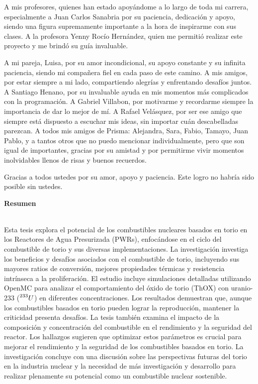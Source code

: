 A mis profesores, quienes han estado apoyándome a lo largo de toda mi carrera, especialmente a Juan Carlos Sanabria por su paciencia, dedicación y apoyo, siendo una figura supremamente importante a la hora de inspirarme con sus clases. A la profesora Yenny Rocío Hernández, quien me permitió realizar este proyecto y me brindó su guía invaluable.

A mi pareja, Luisa, por su amor incondicional, su apoyo constante y su infinita paciencia, siendo mi compañera fiel en cada paso de este camino. A mis amigos, por estar siempre a mi lado, compartiendo alegrías y enfrentando desafíos juntos. A Santiago Henano, por su invaluable ayuda en mis momentos más complicados con la programación. A Gabriel Villabon, por motivarme y recordarme siempre la importancia de dar lo mejor de mí. A Rafael Velásquez, por ser ese amigo que siempre está dispuesto a escuchar mis ideas, sin importar cuán descabelladas parezcan. A todos mis amigos de Prisma: Alejandra, Sara, Fabio, Tamayo, Juan Pablo, y a tantos otros que no puedo mencionar individualmente, pero que son igual de importantes, gracias por su amistad y por permitirme vivir momentos inolvidables llenos de risas y buenos recuerdos.

Gracias a todos ustedes por su amor, apoyo y paciencia. Este logro no habría sido posible sin ustedes.
\newpage

\textbf{\LARGE Resumen}
\\
Esta tesis explora el potencial de los combustibles nucleares basados en torio en los Reactores de Agua Presurizada (PWRs), enfocándose en el ciclo del combustible de torio y sus diversas implementaciones. La investigación investiga los beneficios y desafíos asociados con el combustible de torio, incluyendo sus mayores ratios de conversión, mejores propiedades térmicas y resistencia intrínseca a la proliferación. El estudio incluye simulaciones detalladas utilizando OpenMC para analizar el comportamiento del óxido de torio (ThOX) con uranio-233 (\(\prescript{233}{}{U}\)) en diferentes concentraciones. Los resultados demuestran que, aunque los combustibles basados en torio pueden lograr la reproducción, mantener la criticidad presenta desafíos. La tesis también examina el impacto de la composición y concentración del combustible en el rendimiento y la seguridad del reactor. Los hallazgos sugieren que optimizar estos parámetros es crucial para mejorar el rendimiento y la seguridad de los combustibles basados en torio. La investigación concluye con una discusión sobre las perspectivas futuras del torio en la industria nuclear y la necesidad de más investigación y desarrollo para realizar plenamente su potencial como un combustible nuclear sostenible.

